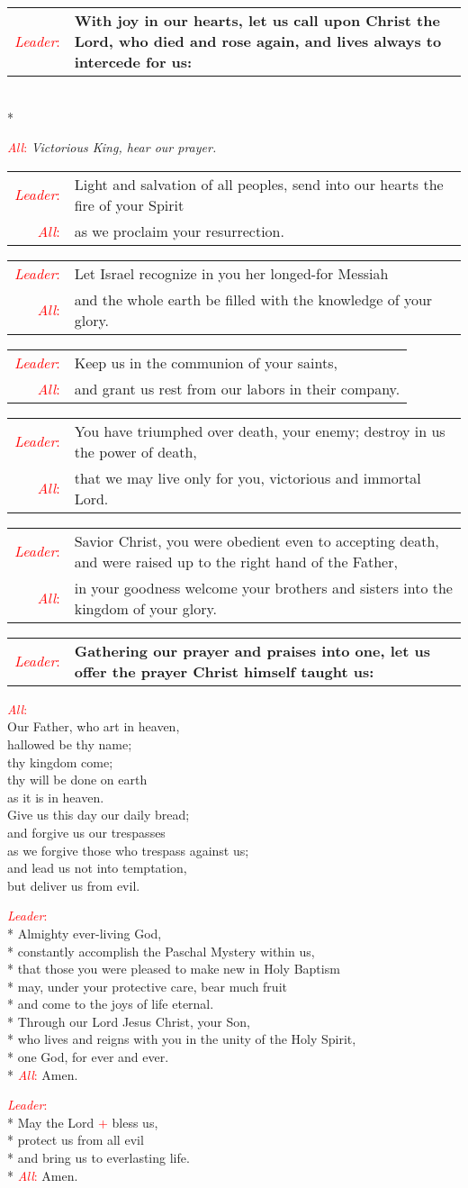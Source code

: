 \documentclass[letterpaper,14pt]{extarticle}
\newcommand{\sidestar}[1]{\textcolor{red}{\textit{#1}:}}
\newcommand{\rednote}[1]{\textcolor{red}{#1}}
\newcommand{\antiphon}[2]{
	\begin{tabular}[h]{r p{4.25in}}
		\sidestar{#1} & \textbf{#2}
	\end{tabular}}
\newcommand{\intercession}[2]{
	\begin{tabular}[h]{r p{4.25in}}
		\sidestar{Leader} & #1 \\
		\sidestar{All} & #2
	\end{tabular}}
\begin{document}
\antiphon{Leader}{With joy in our hearts, let us call upon Christ the Lord, who
died and rose again, and lives always to intercede for us:}\\*
\begin{centering} \sidestar{All} \textit{Victorious King, hear our prayer.}\end{centering}

\intercession{Light and salvation of all peoples, send into our hearts the fire of your Spirit}{as we proclaim your resurrection.}

\intercession{Let Israel recognize in you her longed-for Messiah}
{and the whole earth be filled with the knowledge of your glory.}

\intercession{Keep us in the communion of your saints,}
{and grant us rest from our labors in their company.}

\intercession{You have triumphed over death, your enemy; destroy in us the
power of death,}
{that we may live only for you, victorious and immortal Lord.}

\intercession{Savior Christ, you were obedient even to accepting death, and
were raised up to the right hand of the Father,}
{in your goodness welcome your brothers and sisters into the
kingdom of your glory.}

\antiphon{Leader}{Gathering our prayer and praises into one, let us offer the
prayer Christ himself taught us:}

\sidestar{All}\\
Our Father, who art in heaven, \\
hallowed be thy name; \\
thy kingdom come; \\
thy will be done on earth \\
as it is in heaven. \\
Give us this day our daily bread; \\
and forgive us our trespasses \\
as we forgive those who trespass against us; \\
and lead us not into temptation, \\
but deliver us from evil.

\sidestar{Leader}\\*
Almighty ever-living God, \\*
constantly accomplish the Paschal Mystery within us, \\*
that those you were pleased to make new in Holy Baptism \\*
may, under your protective care, bear much fruit \\*
and come to the joys of life eternal. \\*
Through our Lord Jesus Christ, your Son, \\*
who lives and reigns with you in the unity of the Holy Spirit, \\*
one God, for ever and ever. \\*
\sidestar{All} Amen.


\sidestar{Leader}\\*
May the Lord \rednote{+} bless us, \\*
protect us from all evil \\*
and bring us to everlasting life. \\*
\sidestar{All} Amen.
\end{document}
